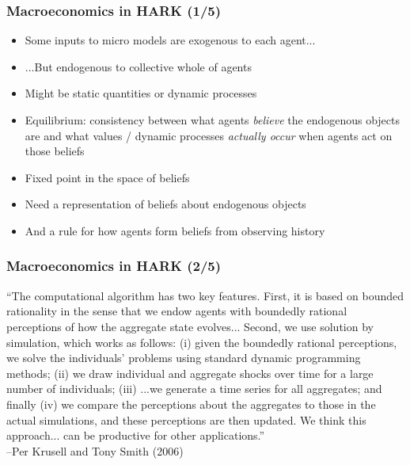 \documentclass[11ptt]{beamer}
\newcommand{\bi}{\begin{itemize}}
\newcommand{\ei}{\end{itemize}}
\begin{document}

\begin{frame}\label{Macroeconomics}
  \frametitle{Macroeconomics in HARK (1/5)}
  \bi
\item <1->Some inputs to micro models are exogenous to each agent...

\item <1->...But endogenous to collective whole of agents

\item <1->Might be static quantities or dynamic processes

\item <2->Equilibrium: consistency between what agents \textit{believe} the endogenous objects are and what values / dynamic processes \textit{actually occur} when agents act on those beliefs

\item <2->Fixed point in the space of beliefs

\item <3->Need a representation of beliefs about endogenous objects

\item <3->And a rule for how agents form beliefs from observing history
  \ei
\end{frame}


\begin{frame}
  \frametitle{Macroeconomics in HARK (2/5)}
  ``The computational algorithm has two key features.  First, it is based on bounded rationality in the sense that we endow agents with boundedly rational perceptions of how the aggregate state evolves...  Second, we use solution by simulation, which works as follows: (i) given the boundedly rational perceptions, we solve the individuals' problems using standard dynamic programming methods; (ii) we draw individual and aggregate shocks over time for a large number of individuals; (iii) ...we generate a time series for all aggregates; and finally (iv) we compare the perceptions about the aggregates to those in the actual simulations, and these perceptions are then updated.  We think this approach... can be productive for other applications.''\\ --Per Krusell and Tony Smith (2006)
\end{frame}
\end{document}
